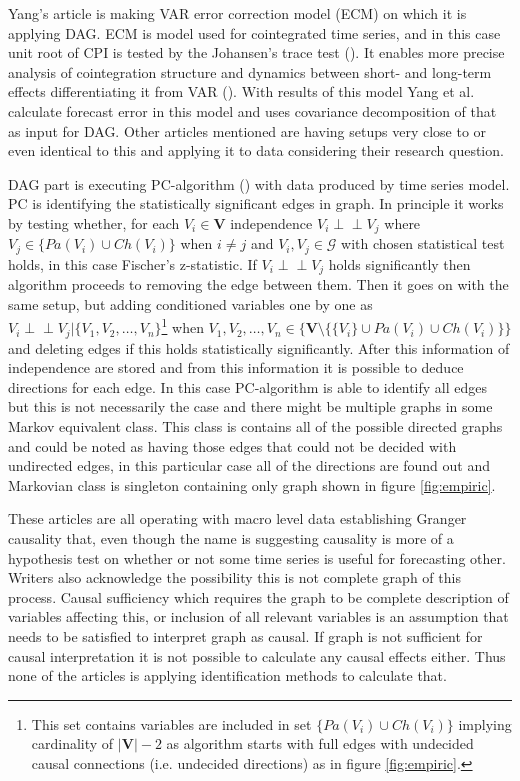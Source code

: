 \documentclass[main=english,12pt,a4paper,pdftex,econ,utf8]{aaltothesis}
\newcommand{\indep}{\perp \!\!\! \perp}
\newcommand{\ch}[1]{Ch(#1)}
\newcommand{\pa}[1]{Pa(#1)}
\newcommand{\g}{\mathcal{G}}
\newcommand{\vars}{\bm{V}}
\begin{document}


Yang's article is making VAR error correction model (ECM) on which it is applying DAG. ECM is model used for cointegrated time series, and in this case unit root of CPI is tested by the Johansen's trace test (\cite{Johansen1991}). It enables more precise analysis of cointegration structure and dynamics between short- and long-term effects differentiating it from VAR (\cite{lütkepohl_krätzig_2004}). With results of this model Yang et al. calculate forecast error in this model and uses covariance decomposition of that as input for DAG. Other articles mentioned are having setups very close to or even identical to this and applying it to data considering their research question.

DAG part is executing PC-algorithm (\cite{Spirtes2000}) with data produced by time series model. PC is identifying the statistically significant edges in graph. In principle it works by testing whether, for each $V_{i}\in\vars$ independence $V_{i}\indep V_{j}$ where $V_{j}\in\{\pa{V_{i}}\cup\ch{V_{i}}\}$
when $i\neq j$ and $V_{i},V_{j}\in\g$ with chosen statistical test holds, in this case Fischer's z-statistic. If $V_{i}\indep V_{j}$ holds significantly then algorithm proceeds to removing the edge between them. Then it goes on with the same setup, but adding conditioned variables one by one as $V_{i}\indep V_{j}|\{V_{1},V_{2},\ldots,V_{n}\}$\footnote{This set contains variables are included in set $\{\pa{V_{i}}\cup\ch{V_{i}}\}$ implying cardinality of $|\vars|-2$ as algorithm starts with full edges with undecided causal connections (i.e. undecided directions) as in figure \ref{fig:empiric}.} when $V_{1},V_{2},\ldots,V_{n}\in\{\vars\setminus\{\{V_{i}\}\cup\pa{V_{i}}\cup\ch{V_{i}}\}\}$ and deleting edges if this holds statistically significantly. After this information of independence are stored and from this information it is possible to deduce directions for each edge. In this case PC-algorithm is able to identify all edges but this is not necessarily the case and there might be multiple graphs in some Markov equivalent class. This class is contains all of the possible directed graphs and could be noted as having those edges that could not be decided with undirected edges, in this particular case all of the directions are found out and Markovian class is singleton containing only graph shown in figure \ref{fig:empiric}.

These articles are all operating with macro level data establishing Granger causality that, even though the name is suggesting causality is more of a hypothesis test on whether or not some time series is useful for forecasting other. Writers also acknowledge the possibility this is not complete graph of this process. Causal sufficiency which requires the graph to be complete description of variables affecting this, or inclusion of all relevant variables is an assumption that needs to be satisfied to interpret graph as causal. If graph is not sufficient for causal interpretation it is not possible to calculate any causal effects either. Thus none of the articles is applying identification methods to calculate that. 
\end{document}
